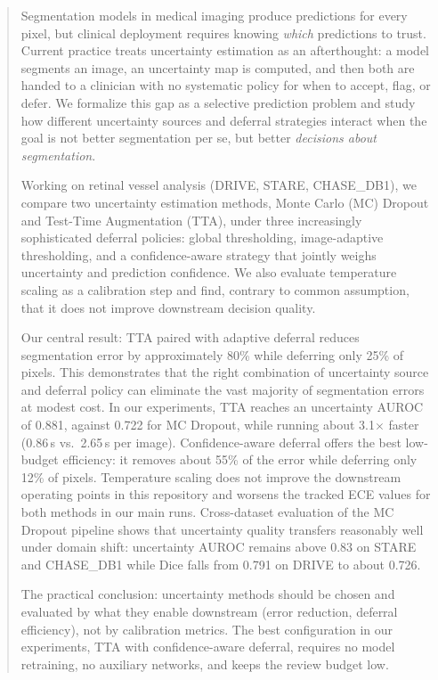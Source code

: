 \begin{abstract}

Segmentation models in medical imaging produce predictions for every pixel, but
clinical deployment requires knowing \emph{which} predictions to trust. Current
practice treats uncertainty estimation as an afterthought: a model segments an
image, an uncertainty map is computed, and then both are handed to a clinician
with no systematic policy for when to accept, flag, or defer. We formalize this
gap as a selective prediction problem and study how different uncertainty
sources and deferral strategies interact when the goal is not better
segmentation per se, but better \emph{decisions about segmentation}.

Working on retinal vessel analysis (DRIVE, STARE, CHASE\_DB1), we compare two
uncertainty estimation methods, Monte Carlo (MC) Dropout and Test-Time
Augmentation (TTA), under three increasingly sophisticated deferral policies:
global thresholding, image-adaptive thresholding, and a confidence-aware
strategy that jointly weighs uncertainty and prediction confidence. We also
evaluate temperature scaling as a calibration step and find, contrary to
common assumption, that it does not improve downstream decision quality.

Our central result: TTA paired with adaptive deferral reduces segmentation
error by approximately 80\% while deferring only 25\% of pixels. This
demonstrates that the right combination of uncertainty source and deferral
policy can eliminate the vast majority of segmentation errors at modest cost.
In our experiments, TTA reaches an uncertainty AUROC of 0.881,
against 0.722 for MC Dropout, while running about 3.1$\times$ faster
(0.86\,s vs.\ 2.65\,s per image). Confidence-aware deferral offers the best
low-budget efficiency: it removes about 55\% of the error while deferring only
12\% of pixels. Temperature scaling does not improve the downstream operating
points in this repository and worsens the tracked ECE values for both methods
in our main runs. Cross-dataset evaluation of the MC Dropout
pipeline shows that uncertainty quality transfers reasonably well under domain
shift: uncertainty AUROC remains above 0.83 on STARE and CHASE\_DB1 while Dice
falls from 0.791 on DRIVE to about 0.726.

The practical conclusion: uncertainty methods should be chosen and evaluated
by what they enable downstream (error reduction, deferral efficiency), not by
calibration metrics. The best configuration in our experiments, TTA with
confidence-aware deferral, requires no model retraining, no auxiliary
networks, and keeps the review budget low.

\end{abstract}
